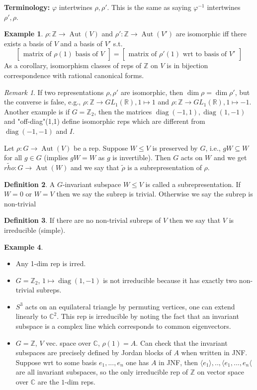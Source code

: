 \documentclass{article}
\theoremstyle{definition}
\newtheorem{defn}{Definition}[section]
\newtheorem{example}[defn]{Example}
\theoremstyle{remark}
\newtheorem{rem}{Remark}
\theoremstyle{plain}
\newcommand{\ZZ}{\mathbb{Z}}
\newcommand{\RR}{\mathbb{R}}
\newcommand{\CC}{\mathbb{C}}
\begin{document}
\textbf{Terminology:} $\varphi$ intertwines $\rho,\rho'$. This is the same as saying $\varphi^{-1}$ intertwines $\rho',\rho$.
\begin{example}
    $\rho:\ZZ\to\operatorname{Aut}(V)$ and $\rho':\ZZ\to\operatorname{Aut}(V')$ are isomorphic iff there exists a basis of $V$ and a basis of $V'$ s.t. 
    \[\begin{bmatrix}\text{matrix of }\rho(1)\text{ basis of }V\end{bmatrix}=\begin{bmatrix}
        \text{matrix of }\rho'(1)\text{ wrt to basis of }V'
    \end{bmatrix}\]
    As a corollary, isomorphism classes of reps of $\ZZ$ on $V$ is in bijection correspondence with rational canonical forms.
\end{example}
\begin{rem}
    If two representations $\rho,\rho'$ are isomorphic, then $\dim\rho=\dim\rho'$, but the converse is false, e.g., $\rho:\ZZ\to GL_1(\RR),1\mapsto 1$ and $\rho:\ZZ\to GL_1(\RR), 1\mapsto -1$. Another example is if $G=\ZZ_2$, then the matrices $\operatorname{diag}(-1,1),\operatorname{diag}(1,-1)$ and "off-diag"(1,1) define isomorphic reps which are different from $\operatorname{diag}(-1,-1)$ and $I$.
\end{rem}
    Let $\rho:G\to\operatorname{Aut}(V)$ be a rep. Suppose $W\le V$ is preserved by $G$, i.e., $gW\subseteq W$ for all $g\in G$ (implies $gW=W$ as $g$ is invertible). Then $G$ acts on $W$ and we get $\tilde{rho}: G\to\operatorname{Aut}(W)$ and we say that $\tilde{\rho}$ is a subrepresentation of $\rho$.
\begin{defn}
    A $G$-invariant subspace $W\le V$ is called a subrepresentation. If $W=0$ or $W=V$ then we say the subrep is trivial. Otherwise we say the subrep is non-trivial
\end{defn}
\begin{defn}
    If there are no non-trivial subreps of $V$ then we say that $V$ is irreducible (simple).
\end{defn}
 \begin{example}
     \begin{itemize}
         \item Any 1-dim rep is irred.
         \item $G=\ZZ_2$, $1\mapsto\operatorname{diag}(1,-1)$ is not irreducible because it has exactly two non-trivial subreps.
         \item $S^3$ acts on an equilateral triangle by permuting vertices, one can extend linearly to $\CC^2$. This rep is irreducible by noting the fact that an invariant subspace is a complex line which corresponds to common eigenvectors.
         \item $G=\ZZ$, $V$ vec. space over $\CC$, $\rho(1)=A$. Can check that the invariant subspaces are precisely defined by Jordan blocks of $A$ when written in JNF. Suppose wrt to some basis $e_1,...,e_n$ one has $A$ in JNF, then $\langle e_1\rangle,..,\langle e_1,...,e_n\langle$ are all invariant subspaces, so the only irreducible rep of $\ZZ$ on vector space over $\CC$ are the $1$-dim reps.
     \end{itemize}
 \end{example}
\end{document}
